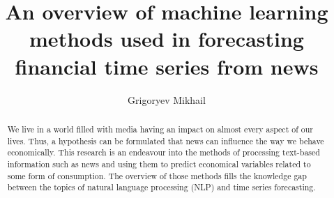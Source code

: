 \documentclass[3p,times,procedia]{elsarticle}
\begin{document}
\begin{frontmatter}





\title{An overview of machine learning methods used in forecasting financial time series from news}




\author[a]{Grigoryev Mikhail}

\address[a]{ITMO University, Kronverksky Pr. 49, bldg. A, St. Petersburg, 197101, Russia}

\begin{abstract}
We live in a world filled with media having an impact on almost every aspect of our lives. Thus, a hypothesis can be formulated that news can influence the way we behave economically. This research is an endeavour into the methods of processing text-based information such as news and using them to predict economical variables related to some form of consumption. The overview of those methods fills the knowledge gap between the topics of natural language processing (NLP) and time series forecasting.
\end{abstract}


\end{frontmatter}
\end{document}
